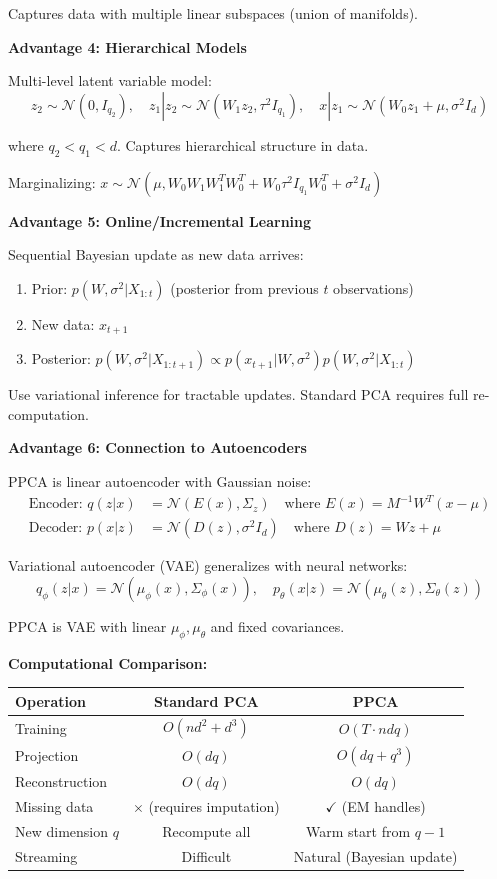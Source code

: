 \documentclass[12pt]{article}
\begin{document}
\begin{explanation}
Captures data with multiple linear subspaces (union of manifolds).

\textbf{Advantage 4: Hierarchical Models}

Multi-level latent variable model:
\[
z_2 \sim \mathcal{N}(0, I_{q_2}), \quad z_1 | z_2 \sim \mathcal{N}(W_1z_2, \tau^2I_{q_1}), \quad x | z_1 \sim \mathcal{N}(W_0z_1 + \mu, \sigma^2I_d)
\]

where $q_2 < q_1 < d$. Captures hierarchical structure in data.

Marginalizing: $x \sim \mathcal{N}(\mu, W_0W_1W_1^TW_0^T + W_0\tau^2I_{q_1}W_0^T + \sigma^2I_d)$

\textbf{Advantage 5: Online/Incremental Learning}

Sequential Bayesian update as new data arrives:
\begin{enumerate}
    \item Prior: $p(W, \sigma^2 | X_{1:t})$ (posterior from previous $t$ observations)
    \item New data: $x_{t+1}$
    \item Posterior: $p(W, \sigma^2 | X_{1:t+1}) \propto p(x_{t+1} | W, \sigma^2)p(W, \sigma^2 | X_{1:t})$
\end{enumerate}

Use variational inference for tractable updates. Standard PCA requires full re-computation.

\textbf{Advantage 6: Connection to Autoencoders}

PPCA is linear autoencoder with Gaussian noise:
\begin{align*}
\text{Encoder: } q(z|x) &= \mathcal{N}(E(x), \Sigma_z) \quad \text{where } E(x) = M^{-1}W^T(x-\mu) \\
\text{Decoder: } p(x|z) &= \mathcal{N}(D(z), \sigma^2I_d) \quad \text{where } D(z) = Wz + \mu
\end{align*}

Variational autoencoder (VAE) generalizes with neural networks:
\[
q_\phi(z|x) = \mathcal{N}(\mu_\phi(x), \Sigma_\phi(x)), \quad p_\theta(x|z) = \mathcal{N}(\mu_\theta(z), \Sigma_\theta(z))
\]

PPCA is VAE with linear $\mu_\phi, \mu_\theta$ and fixed covariances.

\textbf{Computational Comparison:}

\begin{center}
\begin{tabular}{l|c|c}
\textbf{Operation} & \textbf{Standard PCA} & \textbf{PPCA} \\
\hline
Training & $O(nd^2 + d^3)$ & $O(T \cdot ndq)$ \\
Projection & $O(dq)$ & $O(dq + q^3)$ \\
Reconstruction & $O(dq)$ & $O(dq)$ \\
Missing data & $\times$ (requires imputation) & $\checkmark$ (EM handles) \\
New dimension $q$ & Recompute all & Warm start from $q-1$ \\
Streaming & Difficult & Natural (Bayesian update)
\end{tabular}
\end{center}


\end{explanation}
\end{document}
